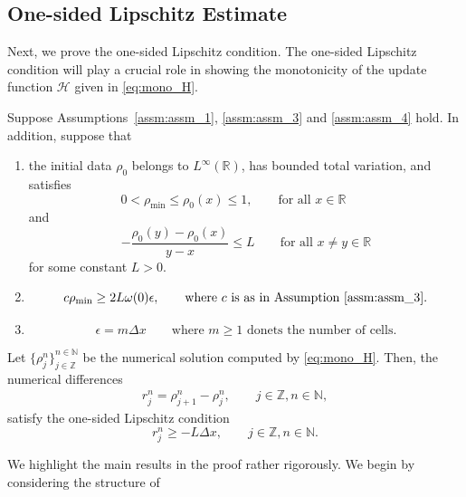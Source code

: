
\subsection{One-sided Lipschitz Estimate}
Next, we prove the one-sided Lipschitz condition. The one-sided Lipschitz condition will play a crucial role in showing the monotonicity of the update function $\mathcal{H}$ given in \eqref{eq:mono_H}.
\begin{lemma}\label{lem:lemma_1}
    Suppose Assumptions~\ref{assm:assm_1}, \ref{assm:assm_3} and \ref{assm:assm_4} hold. In addition, suppose that
    \begin{enumerate}
        \item the initial data $\rho_0$ belongs to $L^\infty(\mathbb{R})$, has bounded total variation, and satisfies
              \[
                  0< \rho_{\min} \leq \rho_0(x) \le 1,  \qquad \text{for all } x \in \mathbb{R}
                  \qquad
              \]
              and
              \[
                  -\frac{\rho_0(y)-\rho_0(x)}{y-x} \le L
                  \qquad \text{for all } x \ne y \in \mathbb{R}
              \]
              for some constant $L>0$.

        \item \[
                  c\rho_{\min}\geq 2L\omega(0)\epsilon, \qquad \text{where $c$ is as in Assumption~\ref{assm:assm_3}}.
              \]
        \item
              \[
                  \epsilon= m \Delta x  \qquad \text{where $m \geq 1$ donets the number of cells}.
              \]
    \end{enumerate}
    Let $\{\rho_j^n\}_{j \in \mathbb{Z}}^{ n \in \mathbb{N}}$ be the numerical solution computed by \eqref{eq:mono_H}.
    Then, the numerical differences
    \begin{align*}
        r_j^n = \rho_{j+1}^n - \rho_j^n, \qquad j \in \mathbb{Z}, n \in \mathbb{N},
    \end{align*}
    satisfy the one-sided Lipschitz condition
    \begin{equation}\label{eq:one_sided_condition}
        r_j^n \geq -L\Delta x,  \qquad j \in \mathbb{Z}, n \in \mathbb{N}.
    \end{equation}
\end{lemma}
We highlight the main results in the proof rather rigorously. We begin by considering the structure of
